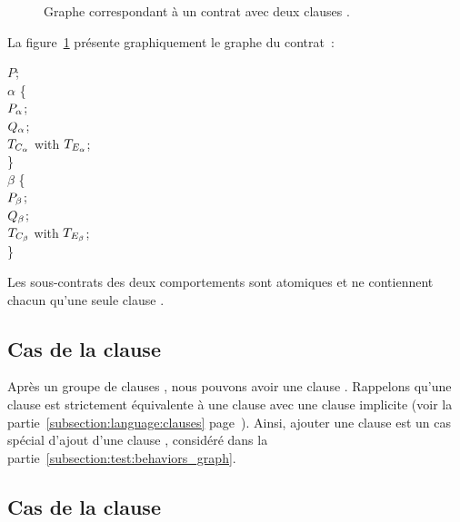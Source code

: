 \begin{figure}[p!]


\caption{\label{figure:test:graph_two_behaviors.tex} Graphe correspondant à
un contrat avec deux clauses \abehavior.}

\end{figure}

\begin{example}

La figure~\ref{figure:test:graph_two_behaviors.tex} présente graphiquement le
graphe du contrat~:
%
\begin{pre}
\arequires \(P\); \\
\abehavior \(\alpha\) \{ \\
    \arequires  \(P\sb{\alpha}\); \\
    \aensures   \(Q\sb{\alpha}\); \\
    \athrowable \(T\sb{C\sb{\alpha}}\) with \(T\sb{E\sb{\alpha}}\); \\
\} \\
\abehavior \(\beta\) \{ \\
    \arequires  \(P\sb{\beta}\); \\
    \aensures   \(Q\sb{\beta}\); \\
    \athrowable \(T\sb{C\sb{\beta}}\) with \(T\sb{E\sb{\beta}}\); \\
\}
\end{pre}
%
Les sous-contrats des deux comportements sont atomiques et ne contiennent chacun
qu'une seule clause \athrowable.

\end{example}

\subsection{Cas de la clause \adefault}
\label{subsection:test:default_graph}

Après un groupe de clauses \abehavior, nous pouvons avoir une clause \adefault.
Rappelons qu'une clause \adefault est strictement équivalente à une clause
\abehavior avec une clause \arequires implicite (voir la
partie~\ref{subsection:language:clauses}
page~\pageref{subsection:language:clauses}). Ainsi, ajouter une clause \adefault
est un cas spécial d'ajout d'une clause \abehavior, considéré dans la
partie~\ref{subsection:test:behaviors_graph}.

\subsection{Cas de la clause \ainvariant}
\label{subsection:test:invariant_graph}

